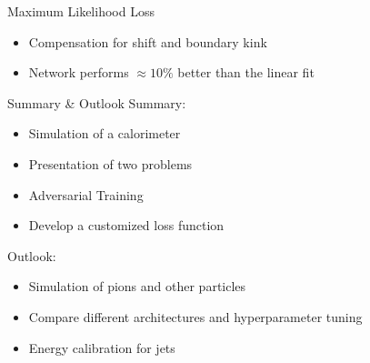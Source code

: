 \documentclass[10pt]{beamer}
\begin{document}
\begin{frame}{Maximum Likelihood Loss}
  \begin{itemize}
  \item Compensation for shift and boundary kink
  \item Network performs $\approx 10\%$ better than the linear fit 
  \end{itemize}
  
\end{frame}

\begin{frame}{Summary \& Outlook}
  Summary:
  \begin{itemize}
  \item Simulation of a calorimeter
  \item Presentation of two problems
  \item Adversarial Training
  \item Develop a customized loss function
  \end{itemize}
  Outlook:
  \begin{itemize}
  \item Simulation of pions and other particles
  \item Compare different architectures and hyperparameter tuning
  \item Energy calibration for jets
  \end{itemize}
\end{frame}
\end{document}
